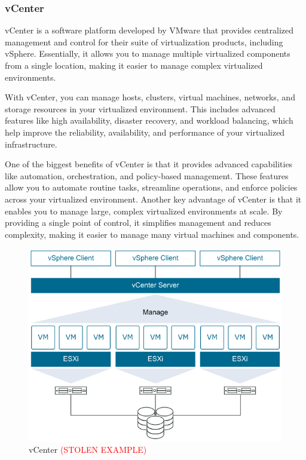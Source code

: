 \subsubsection{vCenter}
vCenter is a software platform developed by VMware that provides centralized management and control for their suite of virtualization products, including vSphere. Essentially, it allows you to manage multiple virtualized components from a single location, making it easier to manage complex virtualized environments.

With vCenter, you can manage hosts, clusters, virtual machines, networks, and storage resources in your virtualized environment. This includes advanced features like high availability, disaster recovery, and workload balancing, which help improve the reliability, availability, and performance of your virtualized infrastructure.

One of the biggest benefits of vCenter is that it provides advanced capabilities like automation, orchestration, and policy-based management. These features allow you to automate routine tasks, streamline operations, and enforce policies across your virtualized environment. Another key advantage of vCenter is that it enables you to manage large, complex virtualized environments at scale. By providing a single point of control, it simplifies management and reduces complexity, making it easier to manage many virtual machines and components.

\begin{figure}[H]
    \centering
    \includegraphics[scale = 0.65]{images/vmware-infrastructure-relationship.png}
    \caption{vCenter \textcolor{red}{(STOLEN EXAMPLE)} }
    \label{vCenter}
\end{figure}

